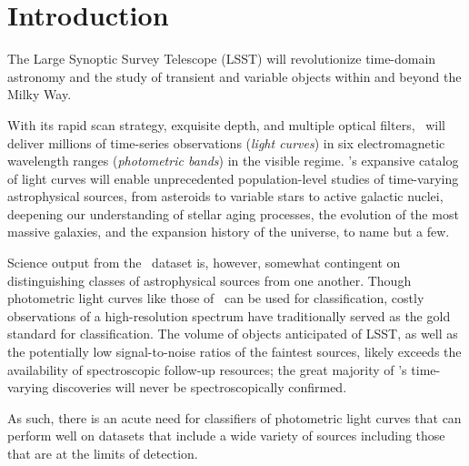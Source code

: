\section{Introduction}
\label{sec:intro}

The Large Synoptic Survey Telescope (LSST) will revolutionize time-domain astronomy
and the study of transient and variable objects within and beyond the Milky Way.

With its rapid scan strategy, exquisite depth, and multiple optical filters, \lsst\ will deliver millions of time-series observations (\textit{light curves}) in six electromagnetic wavelength ranges (\textit{photometric bands}) in the visible regime.
\lsst's expansive catalog of light curves will enable unprecedented population-level studies of time-varying astrophysical sources, from asteroids to variable stars to active galactic nuclei, deepening our understanding of stellar aging processes, the evolution of the most massive galaxies, and the expansion history of the universe, to name but a few.

Science output from the \lsst\ dataset is, however, somewhat contingent on distinguishing classes of astrophysical sources from one another.
Though photometric light curves like those of \lsst\ can be used for classification, costly observations of a high-resolution spectrum have traditionally served as the gold standard for classification.
The volume of objects anticipated of LSST, as well as the potentially low signal-to-noise ratios of the faintest sources, likely exceeds the availability of spectroscopic follow-up resources; the great majority of \lsst's time-varying discoveries will never be spectroscopically confirmed.

As such, there is an acute need for classifiers of photometric light curves that can perform well on datasets that include a wide variety of sources including those that are at the limits of detection.

